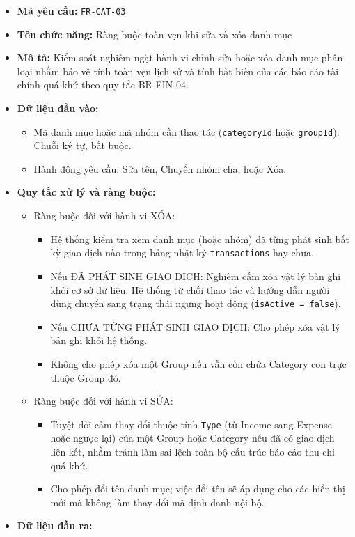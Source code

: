 \documentclass[11pt,a4paper]{article}
\providecommand{\tightlist}{
  \setlength{\itemsep}{0pt}\setlength{\parskip}{0pt}}
\begin{document}
\begin{itemize}
\tightlist
\item
  \textbf{Mã yêu cầu:} \texttt{FR-CAT-03}
\item
  \textbf{Tên chức năng:} Ràng buộc toàn vẹn khi sửa và xóa danh mục
\item
  \textbf{Mô tả:} Kiểm soát nghiêm ngặt hành vi chỉnh sửa hoặc xóa danh
  mục phân loại nhằm bảo vệ tính toàn vẹn lịch sử và tính bất biến của
  các báo cáo tài chính quá khứ theo quy tắc BR-FIN-04.
\item
  \textbf{Dữ liệu đầu vào:}

  \begin{itemize}
  \tightlist
  \item
    Mã danh mục hoặc mã nhóm cần thao tác (\texttt{categoryId} hoặc
    \texttt{groupId}): Chuỗi ký tự, bắt buộc.
  \item
    Hành động yêu cầu: Sửa tên, Chuyển nhóm cha, hoặc Xóa.
  \end{itemize}
\item
  \textbf{Quy tắc xử lý và ràng buộc:}

  \begin{itemize}
  \tightlist
  \item
    Ràng buộc đối với hành vi XÓA:

    \begin{itemize}
    \tightlist
    \item
      Hệ thống kiểm tra xem danh mục (hoặc nhóm) đã từng phát sinh bất
      kỳ giao dịch nào trong bảng nhật ký \texttt{transactions} hay
      chưa.
    \item
      Nếu ĐÃ PHÁT SINH GIAO DỊCH: Nghiêm cấm xóa vật lý bản ghi khỏi cơ
      sở dữ liệu. Hệ thống từ chối thao tác và hướng dẫn người dùng
      chuyển sang trạng thái ngưng hoạt động
      (\texttt{isActive\ =\ false}).
    \item
      Nếu CHƯA TỪNG PHÁT SINH GIAO DỊCH: Cho phép xóa vật lý bản ghi
      khỏi hệ thống.
    \item
      Không cho phép xóa một Group nếu vẫn còn chứa Category con trực
      thuộc Group đó.
    \end{itemize}
  \item
    Ràng buộc đối với hành vi SỬA:

    \begin{itemize}
    \tightlist
    \item
      Tuyệt đối cấm thay đổi thuộc tính \texttt{Type} (từ Income sang
      Expense hoặc ngược lại) của một Group hoặc Category nếu đã có giao
      dịch liên kết, nhằm tránh làm sai lệch toàn bộ cấu trúc báo cáo
      thu chi quá khứ.
    \item
      Cho phép đổi tên danh mục; việc đổi tên sẽ áp dụng cho các hiển
      thị mới mà không làm thay đổi mã định danh nội bộ.
    \end{itemize}
  \end{itemize}
\item
  \textbf{Dữ liệu đầu ra:}


\end{itemize}
\end{document}
